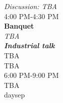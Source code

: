 \begin{calendar}{\textwidth}
{\textit{Discussion: TBA}  \\\vspace{0.1cm}4:00 PM-4:30 PM \\\daysep
\textbf{Banquet} \\
\textit{TBA}\\\vspace{0.1cm} \textbf{\textit{Industrial talk}} \\ TBA \\TBA\\\vspace{0.1cm}  6:00 PM-9:00 PM \\ TBA\\daysep
}




\end{calendar}
